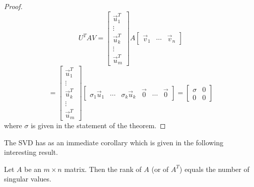\documentclass{ximera}
\begin{document}
\begin{proof}
\begin{equation*}
U^TAV=\left[
\begin{array}{c}
\vec{u}_{1}^T \\
\vdots \\
\vec{u}_{k}^T \\
\vdots \\
\vec{u}_{m}^T
\end{array}
\right] A  \left[ \begin{array}{ccc} \vec{v}_{1} & \cdots & \vec{v}_{n}\end{array}\right]
\end{equation*}
\begin{equation*}
=\left[
\begin{array}{c}
\vec{u}_{1}^T \\
\vdots \\
\vec{u}_{k}^T \\
\vdots \\
\vec{u}_{m}^T
\end{array}
\right] \left[
\begin{array}{cccccc}
\sigma _{1}\vec{u}_{1} & \cdots & \sigma _{k}\vec{u}_{k} & \vec{0}
& \cdots & \vec{0}
\end{array}
\right] =\left[
\begin{array}{cc}
\sigma & 0 \\
0 & 0
\end{array}
\right]
\end{equation*}
where $\sigma $ is given in the statement of the theorem.
\end{proof}

The SVD has as an immediate corollary which is given in the following interesting result.

\begin{corollary}\label{cor:ranksingularvalues}
Let $A$ be an $m\times n$ matrix. Then the rank of $A$ (or of $A^T$) equals
the number of singular values.
\end{corollary}
\end{document}
